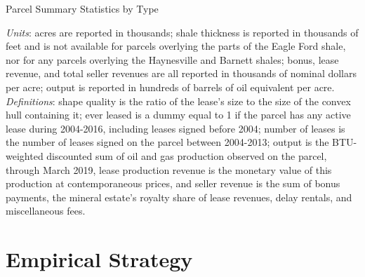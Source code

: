 \addtolength{\tabcolsep}{-3pt}
\begin{table}[htpb]
\begin{center}
\begin{threeparttable}
	\caption{Parcel Summary Statistics by Type}
	\label{tab:summary_stats_parcels}
 	\small
	
	\footnotesize
    \begin{tablenotes}
    \item \textit{Units}: acres are reported in thousands; shale thickness is reported in thousands of feet and is not available for parcels overlying the parts of the Eagle Ford shale, nor for any parcels overlying the Haynesville and Barnett shales; bonus, lease revenue, and total seller revenues are all reported in thousands of nominal dollars per acre; output is reported in hundreds of barrels of oil equivalent per acre.  \textit{Definitions}: shape quality is the ratio of the lease's size to the size of the convex hull containing it; ever leased is a dummy equal to 1 if the parcel has any active lease during 2004-2016, including leases signed before 2004; number of leases is the number of leases signed on the parcel between 2004-2013; output is the BTU-weighted discounted sum of oil and gas production observed on the parcel, through March 2019, lease production revenue is the monetary value of this production at contemporaneous prices, and seller revenue is the sum of bonus payments, the mineral estate's royalty share of lease revenues, delay rentals, and miscellaneous fees. 
    \end{tablenotes}
\end{threeparttable}
\end{center}
\end{table}
\addtolength{\tabcolsep}{3pt}

\section{Empirical Strategy \label{sec:EmpiricalStrategy}}

